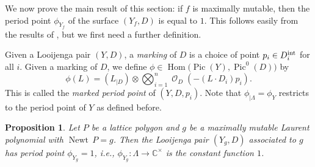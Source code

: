 \documentclass[pdftex]{sigma}
\numberwithin{equation}{section}
\newtheorem{Proposition}[Theorem]{Proposition}
{ \theoremstyle{definition}
	\newtheorem{Definition}[Theorem]{Definition}
	\newtheorem{Note}[Theorem]{Note}
	\newtheorem{Example}[Theorem]{Example}
	\newtheorem{Remark}[Theorem]{Remark} }
\DeclareMathOperator{\Hom}{{Hom}}
\DeclareMathOperator{\Newt}{{Newt \,}}
\DeclareMathOperator{\Pic}{{Pic}}
\DeclareMathOperator{\cO}{\mathcal{O}}
\newcommand{\CC}{\mathbb{C}}
\begin{document}
	We now prove the main result of this section: if $f$ is maximally mutable, then the period point $\phi_{Y_f}$ of the surface $(Y_f, D)$ is equal to $1$. This follows easily from the results of \cite{GrossHackingKeelLooijengapairs}, but we first need a further definition.
	\begin{Definition}
		Given a Looijenga pair $(Y, D)$, a \emph{marking} of $D$ is a choice of point $p_i \in D_i^{\rm int}$ for all $i$. Given a marking of $D$, we define $\phi \in \Hom\bigl(\Pic(Y), \Pic^0(D)\bigr)$ by
		\[
		\phi(L)=(L_{\mid D}) \otimes \bigotimes_{i=1}^n \cO_D(-(L \cdot D_i)p_i).
		\]
		This is called the \emph{marked period point} of $(Y, D, p_i)$.
		Note that $\phi_{\mid \Lambda}=\phi_Y$ restricts to the period point of $Y$ as defined before.
	\end{Definition}
	
	\begin{Proposition}\label{periodpoint1}
		Let $P$ be a lattice polygon and $g$ be a maximally mutable Laurent polynomial with $\Newt P =g$. Then the Looijenga pair $(Y_g, D)$ associated to $g$ has period point $\phi_{Y_g}=1$, i.e., $\phi_{Y_g} \colon \Lambda \rightarrow \CC^\times$ is the constant function $1$.
	\end{Proposition}
	
\end{document}
